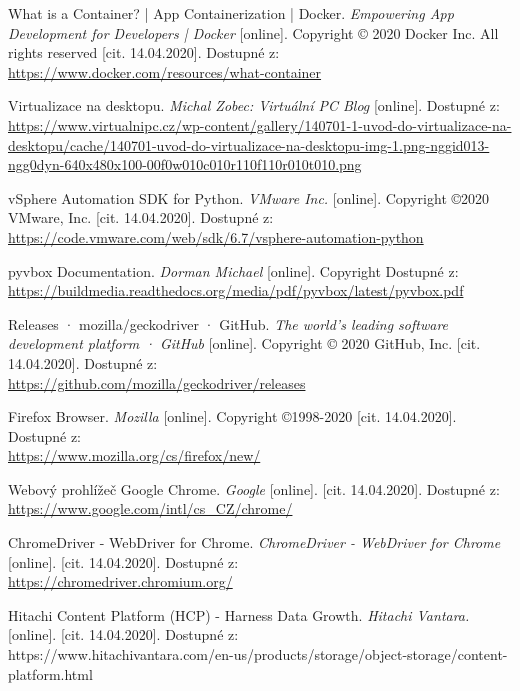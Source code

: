 \documentclass[thesis=M,czech,hidelinks]{FITthesis}[2013/05/06]
\begin{document}
\begin{thebibliography}{9}
	What is a Container? | App Containerization | Docker. \textit{Empowering App Development for Developers | Docker} [online]. Copyright © 2020 Docker Inc. All rights reserved [cit. 14.04.2020]. Dostupné z: \\ 
	\url{https://www.docker.com/resources/what-container}
	
	Virtualizace na desktopu. \textit{Michal Zobec: Virtuální PC Blog} [online]. Dostupné z: \\  
	\url{https://www.virtualnipc.cz/wp-content/gallery/140701-1-uvod-do-virtualizace-na-desktopu/cache/140701-uvod-do-virtualizace-na-desktopu-img-1.png-nggid013-ngg0dyn-640x480x100-00f0w010c010r110f110r010t010.png}
	
	vSphere Automation SDK for Python. \textit{VMware Inc.} [online]. Copyright ©2020 VMware, Inc. [cit. 14.04.2020]. Dostupné z:  \\ 
	\url{https://code.vmware.com/web/sdk/6.7/vsphere-automation-python}
	
	pyvbox Documentation. \textit{Dorman Michael} [online]. Copyright  Dostupné z: \\ 
	\url{https://buildmedia.readthedocs.org/media/pdf/pyvbox/latest/pyvbox.pdf}
	
	Releases · mozilla/geckodriver · GitHub. \textit{The world’s leading software development platform · GitHub} [online]. Copyright © 2020 GitHub, Inc. [cit. 14.04.2020]. Dostupné z:  \\ 
	\url{https://github.com/mozilla/geckodriver/releases}
	
	Firefox Browser. \textit{Mozilla} [online]. Copyright ©1998-2020 [cit. 14.04.2020]. Dostupné z:  \\ 
	\url{https://www.mozilla.org/cs/firefox/new/}
	
	Webový prohlížeč Google Chrome. \textit{Google} [online]. [cit. 14.04.2020]. Dostupné z:  \\ 
	\url{https://www.google.com/intl/cs_CZ/chrome/}
	
	ChromeDriver - WebDriver for Chrome. \textit{ChromeDriver - WebDriver for Chrome} [online]. [cit. 14.04.2020]. Dostupné z: \\ 
	\url{https://chromedriver.chromium.org/}
	
	Hitachi Content Platform (HCP) - Harness Data Growth. \textit{Hitachi Vantara.} [online]. [cit. 14.04.2020]. Dostupné z: \\ https://www.hitachivantara.com/en-us/products/storage/object-storage/content-platform.html
	

\end{thebibliography}
\end{document}
